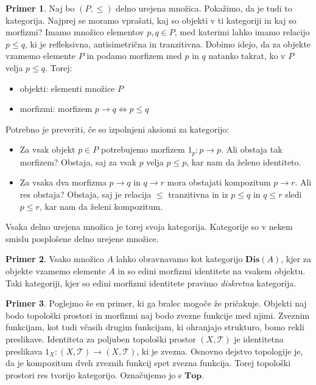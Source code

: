 \documentclass[12pt,a4paper]{book}
\theoremstyle{definition}
\theoremstyle{plain}
\theoremstyle{definition}
\newtheorem{primer}{Primer}[section]
\theoremstyle{remark}
\newcommand{\cat}[1]{\textbf{#1}}
\begin{document}
\begin{primer}
Naj bo $(P, \leq)$ delno urejena množica. Pokažimo, da je tudi to kategorija. Najprej se moramo vprašati, kaj so objekti v ti kategoriji in kaj so morfizmi?
Imamo množico elementov $p,q \in P$, med katerimi lahko imamo relacijo $p \leq q$, ki je refleksivna, antisimetrična in tranzitivna. Dobimo idejo, da za objekte vzamemo elemente $P$ in podamo morfizem med $p$ in $q$ natanko takrat, ko v $P$ velja $p \leq q$.
Torej: 
\begin{itemize}
\item objekti: elementi množice $P$
\item morfizmi: morfizem $p \rightarrow q \Leftrightarrow p \leq q$
\end{itemize}
Potrebno je preveriti, če so izpolnjeni aksiomi za kategorijo:

\begin{itemize}
\item Za vsak objekt $p \in P$ potrebujemo morfizem $1_p : p \to p$. Ali obstaja tak morfizem? Obstaja, saj za vsak $p$ velja $p \leq p$, kar nam da želeno identiteto.
\item Za vsaka dva morfizma $p \to q$ in $q \to r$ mora obstajati kompozitum $p \to r$. Ali res obstaja? Obstaja, saj je relacija $\leq$ tranzitivna in iz $p \leq q$ in $q \leq r$ sledi $p \leq r$, kar nam da želeni kompozitum.
\end{itemize}
Vsaka delno urejena množica je torej svoja kategorija. Kategorije so v nekem smislu posplošene delno urejene množice.
\end{primer}



\begin{primer}
Vsako množico $A$ lahko obravnavamo kot kategorijo $\cat{Dis}(A)$, kjer za objekte vzamemo elemente $A$ in so edini morfizmi identitete na vsakem objektu. Taki kategoriji, kjer so edini morfizmi identitete pravimo \emph{diskretna} kategorija.
\end{primer}

\begin{primer}
Poglejmo še en primer, ki ga bralec mogoče že pričakuje. Objekti naj bodo topološki prostori in morfizmi naj bodo zvezne funkcije med njimi. Zveznim funkcijam, kot tudi včasih drugim funkcijam, ki ohranjajo strukturo, bomo rekli preslikave. Identiteta za poljuben topološki prostor $(X, \mathcal{T})$ je identitetna preslikava $1_X : (X, \mathcal{T}) \to (X, \mathcal{T})$, ki je zvezna. Osnovno dejstvo topologije je, da je kompozitum dveh zveznih funkcij spet zvezna funkcija. Torej topološki prostori res tvorijo kategorijo. Označujemo jo s $\cat{Top}$.
\end{primer}
\end{document}
